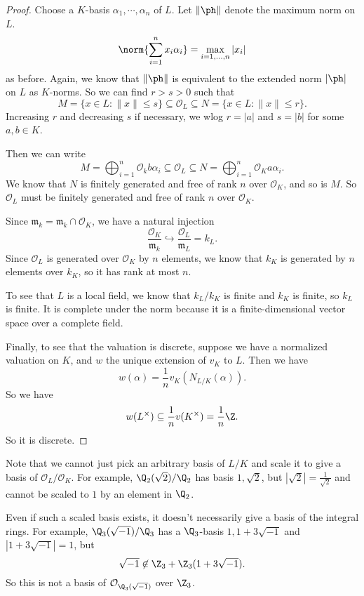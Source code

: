 \documentclass[a4paper]{article}
\begin{document}
\begin{proof}
  Choose a $K$-basis $\alpha_1, \cdots, \alpha_n$ of $L$. Let $\|\ph\|$ denote the maximum norm on $L$.
  \[
    \norm{\sum_{i = 1}^n x_i \alpha_i} = \max_{i = 1, \ldots, n} |x_i|
  \]
  as before. Again, we know that $\|\ph\|$ is equivalent to the extended norm $|\ph|$ on $L$ as $K$-norms. So we can find $r > s > 0$ such that
  \[
    M = \{x \in L: \|x\| \leq s\} \subseteq \mathcal{O}_L \subseteq N = \{x \in L : \|x\| \leq r\}.
  \]
  Increasing $r$ and decreasing $s$ if necessary, we wlog $r = |a|$ and $s = |b|$ for some $a, b \in K$.

  Then we can write
  \[
    M = \bigoplus_{i = 1}^n \mathcal{O}_k b \alpha_i \subseteq \mathcal{O}_L \subseteq N = \bigoplus_{i = 1}^n \mathcal{O}_K a \alpha_i.
  \]
  We know that $N$ is finitely generated and free of rank $n$ over $\mathcal{O}_K$, and so is $M$. So $\mathcal{O}_L$ must be finitely generated and free of rank $n$ over $\mathcal{O}_K$.

  Since $\mathfrak{m}_k = \mathfrak{m}_k \cap \mathcal{O}_K$, we have a natural injection
  \[
    \frac{\mathcal{O}_K}{\mathfrak{m}_k} \hookrightarrow \frac{\mathcal{O}_L}{\mathfrak{m}_L} = k_L.
  \]
  Since $\mathcal{O}_L$ is generated over $\mathcal{O}_K$ by $n$ elements, we know that $k_K$ is generated by $n$ elements over $k_K$, so it has rank at most $n$.

  To see that $L$ is a local field, we know that $k_L/k_K$ is finite and $k_K$ is finite, so $k_L$ is finite. It is complete under the norm because it is a finite-dimensional vector space over a complete field.

  Finally, to see that the valuation is discrete, suppose we have a normalized valuation on $K$, and $w$ the unique extension of $v_K$ to $L$. Then we have
  \[
    w(\alpha) = \frac{1}{n} v_K(N_{L/K}(\alpha)).
  \]
  So we have
  \[
    w(L^\times) \subseteq \frac{1}{n} v(K^\times) = \frac{1}{n} \Z.
  \]
  So it is discrete.
\end{proof}

Note that we cannot just pick an arbitrary basis of $L/K$ and scale it to give a basis of $\mathcal{O}_L/\mathcal{O}_K$. For example, $\Q_2(\sqrt{2})/\Q_2$ has basis $1, \sqrt{2}$, but $|\sqrt{2}| = \frac{1}{\sqrt{2}}$ and cannot be scaled to $1$ by an element in $\Q_2$.

Even if such a scaled basis exists, it doesn't necessarily give a basis of the integral rings. For example, $\Q_3(\sqrt{-1}) / \Q_3$ has a $\Q_3$-basis $1, 1 + 3\sqrt{-1}$ and $|1 + 3\sqrt{-1}| = 1$, but
\[
  \sqrt{-1} \not\in \Z_3 + \Z_3(1 + 3\sqrt{-1}).
\]
So this is not a basis of $\mathcal{O}_{\Q_3(\sqrt{-1})}$ over $\Z_3$.
\end{document}
